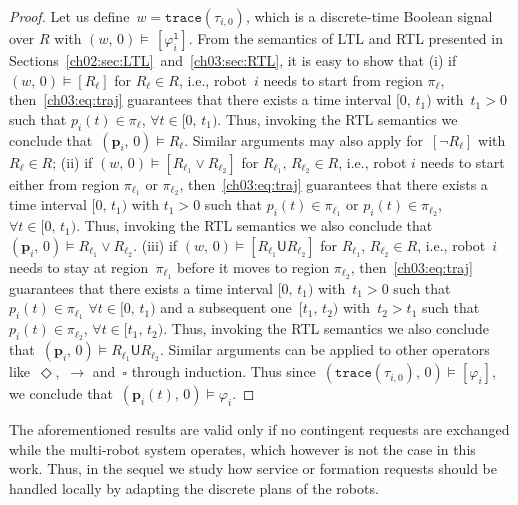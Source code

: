 \begin{proof}
Let us define~$w=\texttt{trace}(\tau_{i,0})$, which is a discrete-time Boolean signal over $R$ with $(w,\,0)\models\, [\varphi_i^\texttt{l}]$.
From the semantics of LTL and RTL presented in Sections~\ref{ch02:sec:LTL}~and~\ref{ch03:sec:RTL}, it is easy to show that
(i) if $(w,\,0)\models [R_{\ell}]$ for $R_{\ell}\in R$, i.e., robot~$i$ needs to start from region $\pi_{\ell}$, then~\eqref{ch03:eq:traj} guarantees that there exists a time interval $[0,\,t_1)$ with~$t_1>0$ such that $p_i(t)\in \pi_{\ell}$, $\forall t\in [0,\,t_1)$. Thus, invoking the RTL semantics we conclude that~$(\mathbf{p}_i,\,0)\models R_{\ell}$. Similar arguments may also apply for~$[\neg R_{\ell}]$ with $R_{\ell}\in R$;
(ii) if $(w,\,0)\models [R_{\ell_1} \vee R_{\ell_2}]$ for $R_{\ell_1},\,R_{\ell_2}\in R$, i.e., robot $i$ needs to start either from region $\pi_{\ell_1}$ or $\pi_{\ell_2}$, then~\eqref{ch03:eq:traj} guarantees that there exists a time interval $[0,\,t_1)$ with $t_1>0$ such that $p_i(t)\in \pi_{\ell_1}$ or $p_i(t)\in \pi_{\ell_2}$, $\forall t\in [0,\,t_1)$. Thus, invoking the RTL semantics we also conclude that $(\mathbf{p}_i,\,0)\models R_{\ell_1} \vee R_{\ell_2}$.
(iii) if $(w,\,0)\models [R_{\ell_1} \mathsf{U} R_{\ell_2}]$ for $R_{\ell_1},\, R_{\ell_2}\in R$, i.e., robot~$i$ needs to stay at region~$\pi_{\ell_1}$ before it moves to region $\pi_{\ell_2}$, then~\eqref{ch03:eq:traj} guarantees that there exists a time interval $[0,\,t_1)$ with~$t_1>0$ such that $p_i(t)\in \pi_{\ell_1}$ $\forall t \in [0,\,t_1)$  and a subsequent one~$[t_1,\,t_2)$ with~$t_2>t_1$ such that $p_i(t)\in \pi_{\ell_2}$,  $\forall t \in [t_1,\,t_2)$. Thus, invoking the RTL semantics we also conclude that~$(\mathbf{p}_i,\,0)\models R_{\ell_1} \mathsf{U} R_{\ell_2}$.
Similar arguments can be applied to other operators like~$\Diamond$,~$\rightarrow$ and~$\square$ through induction.
Thus since~$(\texttt{trace}(\tau_{i,0}),\,0)\models [\varphi_i]$, we conclude that~$(\mathbf{p}_i(t),\,0)\models \varphi_i$.
\end{proof}

The aforementioned results are valid only if no contingent requests are exchanged while the multi-robot system operates, which however is not the case in this work. Thus, in the sequel we study how  service or formation requests should be handled locally by adapting the discrete plans of the robots.

